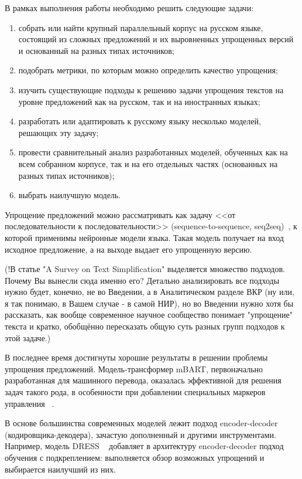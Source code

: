 
В рамках выполнения работы необходимо решить следующие задачи: 
\begin{enumerate}[label={\arabic*)}]
	\item собрать или найти крупный параллельный корпус на русском языке, состоящий из сложных предложений и их выровненных упрощенных версий и основанный на разных типах источников;
	\item подобрать метрики, по которым можно определить качество упрощения;
	\item изучить существующие подходы к решению задачи упрощения текстов на уровне предложений как на русском, так и на иностранных языках;
	\item разработать или адаптировать к русскому языку несколько моделей, решающих эту задачу;
	\item провести сравнительный анализ разработанных моделей, обученных как на всем собранном корпусе, так и на его отдельных частях (основанных на разных типах источников);
	\item выбрать наилучшую модель.
\end{enumerate}




Упрощение предложений можно рассматривать как задачу <<от последовательности к последовательности>> (sequence-to-sequence, seq2seq)~\cite{kazan_federal_university}, к которой применимы нейронные модели языка. Такая модель получает на вход исходное предложение, а на выходе выдает его упрощенную версию.

(!В статье "A Survey on Text Simplification" выделяется множество подходов. Почему Вы вынесли сюда именно его? Детально анализировать все подходы нужно будет, конечно, не во Введении, а в Аналитическом разделе ВКР (ну или, я так понимаю, в Вашем случае - в самой НИР), но во Введении нужно хотя бы рассказать, как вообще современное научное сообщество понимает "упрощение" текста и кратко, обобщённо пересказать общую суть разных групп подходов к этой задаче.)





В последнее время достигнуты хорошие результаты в решении проблемы упрощения предложений. Модель-трансформер mBART, первоначально разработанная для машинного перевода, оказалась эффективной для решения задач такого рода, в особенности при добавлении специальных маркеров управления ~\cite{martin_muss_2021}.

В основе большинства современных моделей лежит подход encoder-decoder (кодировщика-декодера), зачастую дополненный и другими инструментами. Например, модель DRESS ~\cite{fang_learning_2017} добавляет в архитектуру encoder-decoder подход обучения с подкреплением: выполняется обзор возможных упрощений и выбирается наилучший из них.
 
